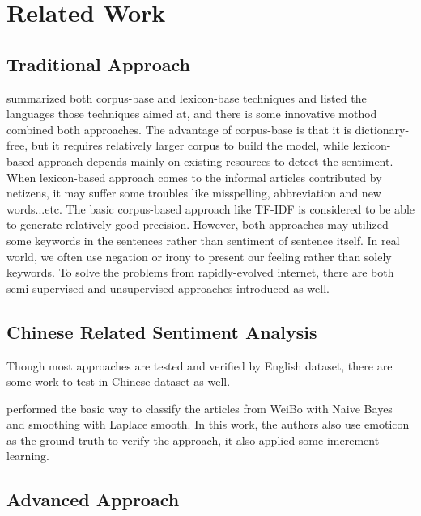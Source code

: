 \chapter{Related Work}


\section{Traditional Approach}

\cite{Dashtipour2016} summarized both corpus-base and lexicon-base techniques and listed the languages those techniques aimed at, and there is some innovative mothod combined both approaches. 
The advantage of corpus-base is that it is dictionary-free, but it requires relatively larger corpus to build the model, while lexicon-based approach depends mainly on existing resources to detect the sentiment.
When lexicon-based approach comes to the informal articles contributed by netizens, it may suffer some troubles like misspelling, abbreviation and new words...etc.   
The basic corpus-based approach like TF-IDF is considered to be able to generate relatively good precision.
However, both approaches may utilized some keywords in the sentences rather than sentiment of sentence itself. In real world, we often use negation or irony to present our feeling rather than solely keywords. 
To solve the problems from rapidly-evolved internet, there are both semi-supervised and unsupervised approaches introduced as well. 

\section{Chinese Related Sentiment Analysis}

Though most approaches are tested and verified by English dataset, there are some work to test in Chinese dataset as well.

\cite{zhao2012moodlens} performed the basic way to classify the articles from WeiBo with Naive Bayes and smoothing with Laplace smooth.  
In this work, the authors also use emoticon as the ground truth to verify the approach, it also applied some imcrement learning. \\


\section{Advanced Approach}

